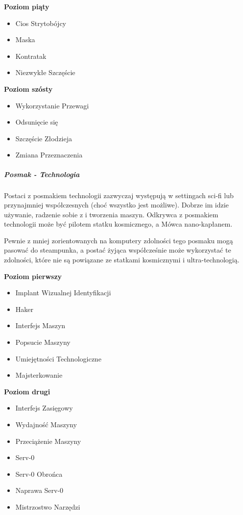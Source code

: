 \textbf{Poziom piąty}
\begin{itemize}
\item Cios Strytobójcy
\item Maska
\item Kontratak
\item Niezwykłe Szczęście
\end{itemize}

\textbf{Poziom szósty}
\begin{itemize}
\item Wykorzystanie Przewagi
\item Odsunięcie się
\item Szczęście Złodzieja
\item Zmiana Przeznaczenia
\end{itemize}

\subparagraph{Posmak - Technologia}

Postaci z posmakiem technologii zazwyczaj występują w settingach sci-fi lub przynajmniej współczesnych (choć wszystko jest możliwe). Dobrze im idzie używanie, radzenie sobie z i tworzenia maszyn. Odkrywca z posmakiem technologii może być pilotem statku kosmicznego, a Mówca nano-kapłanem.

Pewnie z mniej zorientowanych na komputery zdolności tego posmaku mogą pasować do steampunka, a postać żyjąca współcześnie może wykorzystać te zdolności, które nie są powiązane ze statkami kosmicznymi i ultra-technologią.

\textbf{Poziom pierwszy}
\begin{itemize}
\item Implant Wizualnej Identyfikacji
\item Haker
\item Interfejs Maszyn
\item Popsucie Maszyny
\item Umiejętności Technologiczne
\item Majsterkowanie
\end{itemize}

\textbf{Poziom drugi}
\begin{itemize}
\item Interfejs Zasięgowy
\item Wydajność Maszyny
\item Przeciążenie Maszyny
\item Serv-0
\item Serv-0 Obrońca
\item Naprawa Serv-0
\item Mistrzostwo Narzędzi
\end{itemize}

